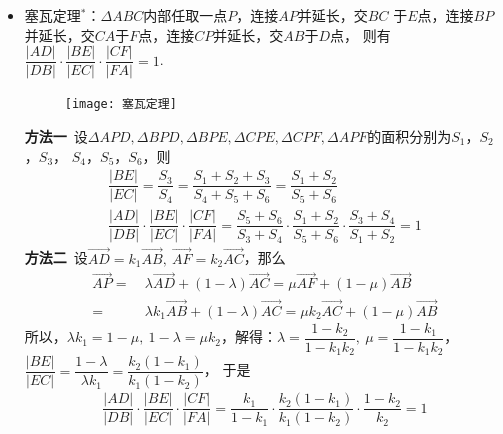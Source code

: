 \begin{itemize}[leftmargin=\inteval{\myitemleftmargin}pt,itemsep=
   \inteval{\myitemitempsep}pt,topsep=\inteval{\myitemtopsep}pt]
\item 塞瓦定理$ ^* $：$ \Delta ABC $内部任取一点$ P $，连接$ AP $并延长，交$ BC $
于$ E $点，连接$ BP $并延长，交$ CA $于$ F $点，连接$ CP $并延长，交$ AB $于$ D $点，
则有$ \dfrac{|AD|}{|DB|} \cdot \dfrac{|BE|}{|EC|} \cdot\dfrac{|CF|}{|FA|}=1 $. 
\begin{figure}[H]
    \centering
    \texttt{[image: 塞瓦定理]}
\end{figure}
\textbf{方法一}\ 设$ \Delta APD,\Delta BPD,\Delta BPE,\Delta CPE,
\Delta CPF,\Delta APF $的面积分别为$S_1$，$S_2$，$S_3$，
$S_4$，$S_5$，$S_6$，则
\begin{gather*}
    \dfrac{|BE|}{|EC|}=\dfrac{S_3}{S_4}=\dfrac{S_1+S_2+S_3}{S_4+S_5+S_6}=
    \dfrac{S_1+S_2}{S_5+S_6}		\\
    \dfrac{|AD|}{|DB|} \cdot \dfrac{|BE|}{|EC|} \cdot\dfrac{|CF|}{|FA|}=
    \dfrac{S_5+S_6}{S_3+S_4} \cdot \dfrac{S_1+S_2}{S_5+S_6} \cdot \dfrac{S_3+S_4}{S_1+S_2} =1
\end{gather*} 
\textbf{方法二}\ 设$ \vec{AD}=k_1\vec{AB},\ \vec{AF}=
k_2\vec{AC} $，那么
\begin{align*}
    \vec{AP}=&\ \lambda \vec{AD}+(1-\lambda)\vec{AC}=
    \mu \vec{AF}+(1-\mu)\vec{AB} \\
    =&\ \lambda k_1\vec{AB}+(1-\lambda)\vec{AC}=
    \mu k_2\vec{AC}+(1-\mu)\vec{AB}
\end{align*}
所以，$ \lambda k_1=1-\mu,\ 1-\lambda=\mu k_2 $，解得：$ \lambda=\dfrac{1-k_2}{1-k_1k_2},
\ \mu=\dfrac{1-k_1}{1-k_1k_2} $，$ \dfrac{|BE|}{|EC|} =\dfrac{1-\lambda}{\lambda k_1} =
\dfrac{k_2(1-k_1)}{k_1(1-k_2)} $，
于是
\begin{align*}
    \dfrac{|AD|}{|DB|} \cdot \dfrac{|BE|}{|EC|} \cdot\dfrac{|CF|}{|FA|}=
    \dfrac{k_1}{1-k_1}\cdot \dfrac{k_2(1-k_1)}{k_1(1-k_2)}\cdot\dfrac{1-k_2}{k_2}=1
\end{align*}


\end{itemize}
